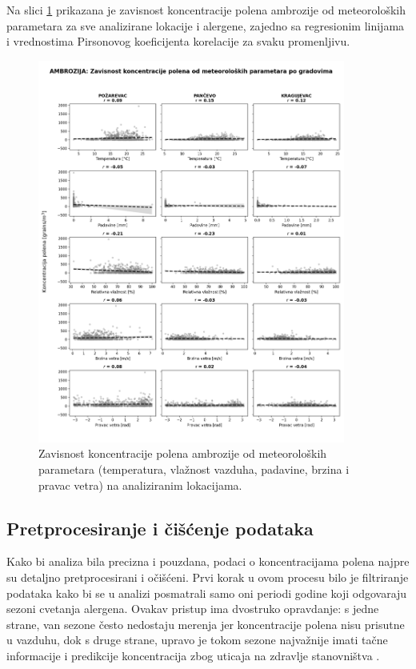 \documentclass[12pt]{article}
\begin{document}
Na slici \ref{fig:ambrozija_meteo_gradovi} prikazana je zavisnost koncentracije polena ambrozije od meteoroloških parametara za sve analizirane lokacije i alergene, zajedno sa regresionim linijama i vrednostima Pirsonovog koeficijenta korelacije za svaku promenljivu.

\begin{figure}[H]
    \centering
    \includegraphics[width=0.9\textwidth]{grafici/meteo_gradovi_AMBROZIJA.png}
    \caption{Zavisnost koncentracije polena ambrozije od meteoroloških parametara (temperatura, vlažnost vazduha, padavine, brzina i pravac vetra) na analiziranim lokacijama.}
    \label{fig:ambrozija_meteo_gradovi}
\end{figure}


\subsection{Pretprocesiranje i čišćenje podataka}

Kako bi analiza bila precizna i pouzdana, podaci o koncentracijama polena najpre su detaljno pretprocesirani i očišćeni. Prvi korak u ovom procesu bilo je filtriranje podataka kako bi se u analizi posmatrali samo oni periodi godine koji odgovaraju sezoni cvetanja alergena. Ovakav pristup ima dvostruko opravdanje: s jedne strane, van sezone često nedostaju merenja jer koncentracije polena nisu prisutne u vazduhu, dok s druge strane, upravo je tokom sezone najvažnije imati tačne informacije i predikcije koncentracija zbog uticaja na zdravlje stanovništva \cite{damato2007, who2003}.
\end{document}
